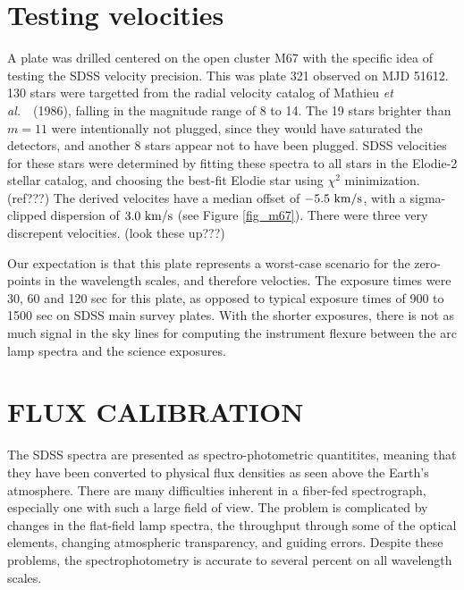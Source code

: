 \documentclass[12pt,preprint]{aastex}
\newcommand{\etal}{{\it et al.}~}
\newcommand{\kms}{{\rm ~km/s}}
\begin{document}
\section{Testing velocities}


A plate was drilled centered on the open cluster M67 with the
specific idea of testing the SDSS velocity precision.
This was plate 321 observed on MJD 51612.  
130 stars were targetted from the radial velocity catalog
of Mathieu \etal\ (1986), falling in the magnitude range of 8 to 14.
The 19 stars brighter than $m=11$ were intentionally not plugged, since they
would have saturated the detectors, and another 8 stars appear not
to have been plugged.  SDSS velocities for these stars were determined
by fitting these spectra to all stars in the Elodie-2 stellar catalog,
and choosing the best-fit Elodie star using $\chi^2$ minimization.  (ref???)
The derived velocites have a median offset of $-5.5\kms$, with a sigma-clipped
dispersion of $3.0 \kms$ (see Figure \ref{fig_m67}).
There were three very discrepent velocities. (look these up???)

Our expectation is that this plate represents a worst-case scenario
for the zero-points in the wavelength scales, and therefore velocties.
The exposure times were 30, 60 and 120 sec for this plate, as opposed
to typical exposure times of 900 to 1500 sec on SDSS main survey plates.
With the shorter exposures, there is not as much signal in the sky lines
for computing the instrument flexure between the arc lamp spectra and
the science exposures.

\section{FLUX CALIBRATION}
\label{sec_fluxing}

The SDSS spectra are presented as spectro-photometric quantitites,
meaning that they have been converted to physical flux densities
as seen above the Earth's atmosphere.
There are many difficulties inherent in a fiber-fed spectrograph,
especially one with such a large field of view.
The problem is complicated by changes in the flat-field lamp spectra,
the throughput through some of the optical elements, changing
atmospheric transparency, and guiding errors.
Despite these problems, the spectrophotometry is accurate to
several percent on all wavelength scales.
\end{document}
